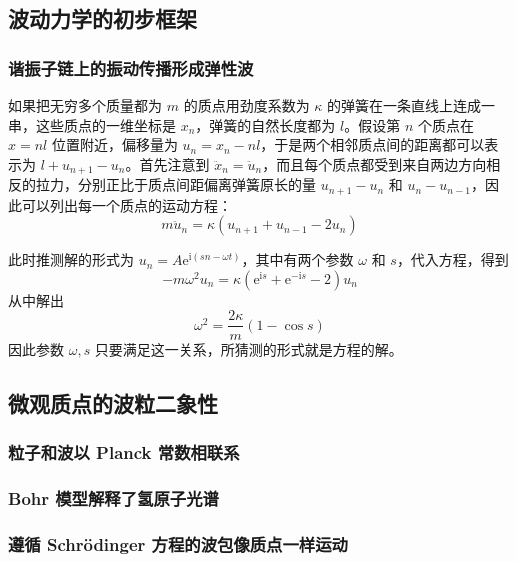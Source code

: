 \documentclass[cn,10pt,math=newtx,citestyle=gb7714-2015,bibstyle=gb7714-2015]{elegantbook}
\def\e{\mathrm e}
\def\i{\mathrm i}
\begin{document}
\subsection{波动力学的初步框架}

\subsubsection{谐振子链上的振动传播形成弹性波}


如果把无穷多个质量都为 $m$ 的质点用劲度系数为 $\kappa$ 的弹簧在一条直线上连成一串，这些质点的一维坐标是 $x_n$，弹簧的自然长度都为 $l$。假设第 $n$ 个质点在 $x=nl$ 位置附近，偏移量为 $u_n=x_n-nl$，于是两个相邻质点间的距离都可以表示为 $l+u_{n+1}-u_{n}$。首先注意到 $\ddot{x}_n=\ddot{u}_n$，而且每个质点都受到来自两边方向相反的拉力，分别正比于质点间距偏离弹簧原长的量 $u_{n+1}-u_n$ 和 $u_n-u_{n-1}$，因此可以列出每一个质点的运动方程：
\begin{equation}
    m\ddot{u}_n =\kappa(u_{n+1}+u_{n-1}-2u_n)
\end{equation}




此时推测解的形式为 $u_n=A\e^{\i(sn-\omega t)}$，其中有两个参数 $\omega$ 和 $s$，代入方程，得到
\begin{equation}
    -m\omega^2 u_n=\kappa(\e^{\i s}+\e^{-\i s}-2) u_n
\end{equation}
从中解出
\begin{equation}
    \omega^2 = \frac{2\kappa}{m}(1-\cos s)
\end{equation}
因此参数 $\omega,s$ 只要满足这一关系，所猜测的形式就是方程的解。




\subsection{微观质点的波粒二象性}

\subsubsection{粒子和波以 Planck 常数相联系}

\subsubsection{Bohr 模型解释了氢原子光谱}

\subsubsection{遵循 Schrödinger 方程的波包像质点一样运动}
\end{document}
